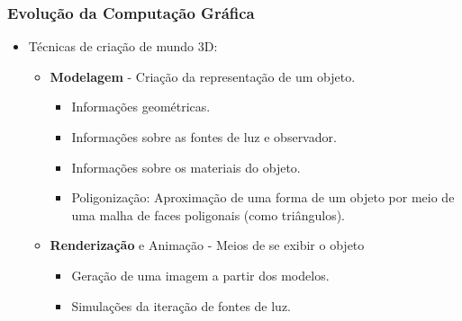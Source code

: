 \documentclass{beamer}
\begin{document}
\begin{frame}
\frametitle{Evolução da Computação Gráfica}

\begin{block}

	\begin{itemize}
		\item<1-> Técnicas de criação de mundo 3D:
		\begin{itemize}
			\item \textbf{Modelagem} - Criação da representação de um objeto.
				\begin{itemize}
					\item Informações geométricas.
					\item Informações sobre as fontes de luz e observador.
					\item Informações sobre os materiais do objeto.
					\item Poligonização: Aproximação de uma forma de um objeto por meio de uma malha de faces poligonais (como triângulos). 
				\end{itemize}
			\item \textbf{Renderização} e Animação - Meios de se exibir o objeto 
				\begin{itemize}
					\item Geração de uma imagem a partir dos modelos.
					\item Simulações da iteração de fontes de luz.
				\end{itemize}
			
		\end{itemize}
	\end{itemize}
\end{block}

\end{frame}


\end{document}
